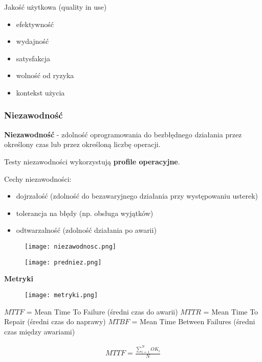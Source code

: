 \documentclass[../main.tex]{subfiles}
\begin{document}
    Jakość użytkowa (quality in use)
    \begin{itemize}
        \item efektywność
        \item wydajność
        \item satysfakcja
        \item wolność od ryzyka
        \item kontekst użycia
    \end{itemize}



    \subsubsection{Niezawodność}

    \textbf{Niezawodność} - zdolność oprogramowania do bezbłędnego działania przez określony czas lub przez określoną
    liczbę operacji.

    Testy niezawodności wykorzystują \textbf{profile operacyjne}.

    Cechy niezawodności:
    \begin{itemize}
        \item dojrzałość (zdolność do bezawaryjnego działania przy występowaniu usterek)
        \item tolerancja na błędy (np. obsługa wyjątków)
        \item odtwarzalność (zdolność działania po awarii)
    \end{itemize}

    \begin{figure}[H]
        \texttt{[image: niezawodnosc.png]}
    \end{figure}

    \begin{figure}[H]
        \texttt{[image: predniez.png]}
    \end{figure}


    \textbf{Metryki}
    \begin{figure}[H]
        \texttt{[image: metryki.png]}
    \end{figure}

    $MTTF$ = Mean Time To Failure (średni czas do awarii)
    $MTTR$ = Mean Time To Repair (średni czas do naprawy)
    $MTBF$ = Mean Time Between Failures (średni czas między awariami)

    \begin{align*}
        MTTF = \frac{\sum_{i=1}^{N} OK_i}{N}
    \end{align*}
\end{document}
